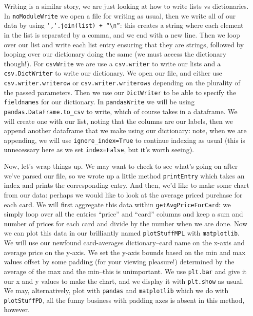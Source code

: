 \documentclass[11pt, twoside, reqno]{book}
\begin{document}
Writing is a similar story, we are just looking at how to write lists vs dictionaries. In \texttt{noModuleWrite} we open a file for writing as usual, then we write all of our data by using \texttt{','.join(list) + ``\textbackslash n''}: this creates a string where each element in the list is separated by a comma, and we end with a new line. Then we loop over our list and write each list entry ensuring that they are strings, followed by looping over our dictionary doing the same (we must access the dictionary though!). For \texttt{csvWrite} we are use a \texttt{csv.writer} to write our lists and a \texttt{csv.DictWriter} to write our dictionary. We open our file, and either use \texttt{csv.writer.writerow} or \texttt{csv.writer.writerows} depending on the plurality of the passed parameters. Then we use our \texttt{DictWriter} to be able to specify the \texttt{fieldnames} for our dictionary. In \texttt{pandasWrite} we will be using \texttt{pandas.DataFrame.to\_csv} to write, which of course takes in a dataframe. We will create one with our list, noting that the columns are our labels, then we append another dataframe that we make using our dictionary: note, when we are appending, we will use \texttt{ignore\_index=True} to continue indexing as usual (this is unnecessary here as we set \texttt{index=False}, but it's worth seeing).

Now, let's wrap things up. We may want to check to see what's going on after we've parsed our file, so we wrote up a little method \texttt{printEntry} which takes an index and prints the corresponding entry. And then, we'd like to make some chart from our data: perhaps we would like to look at the average priced purchase for each card. We will first aggregate this data within \texttt{getAvgPriceForCard}: we simply loop over all the entries ``price'' and ``card'' columns and keep a sum and number of prices for each card and divide by the number when we are done. Now we can plot this data in our brilliantly named \texttt{plotStuffMPL} with \texttt{matplotlib}. We will use our newfound card-averages dictionary--card name on the x-axis and average price on the y-axis. We set the y-axis bounds based on the min and max values offset by some padding (for your viewing pleasure!) determined by the average of the max and the min--this is unimportant. We use \texttt{plt.bar} and give it our x and y values to make the chart, and we display it with \texttt{plt.show} as usual. We may, alternatively, plot with \texttt{pandas} and \texttt{matplotlib} which we do with \texttt{plotStuffPD}, all the funny business with padding axes is absent in this method, however.
\end{document}
